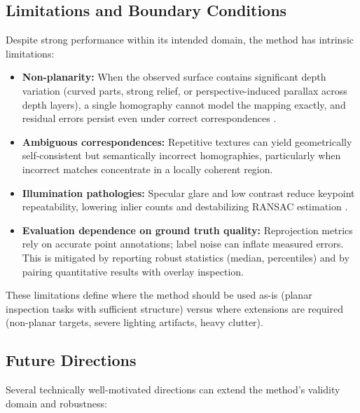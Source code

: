 \subsection{Limitations and Boundary Conditions}
Despite strong performance within its intended domain, the method has intrinsic limitations:

\begin{itemize}
  \item \textbf{Non-planarity:} When the observed surface contains significant depth variation (curved parts, strong relief, or perspective-induced parallax across depth layers), a single homography cannot model the mapping exactly, and residual errors persist even under correct correspondences \cite{HartleyZisserman2004}.
  \item \textbf{Ambiguous correspondences:} Repetitive textures can yield geometrically self-consistent but semantically incorrect homographies, particularly when incorrect matches concentrate in a locally coherent region.
  \item \textbf{Illumination pathologies:} Specular glare and low contrast reduce keypoint repeatability, lowering inlier counts and destabilizing RANSAC estimation \cite{FischlerBolles1981}.
  \item \textbf{Evaluation dependence on ground truth quality:} Reprojection metrics rely on accurate point annotations; label noise can inflate measured errors. This is mitigated by reporting robust statistics (median, percentiles) and by pairing quantitative results with overlay inspection.
\end{itemize}

These limitations define where the method should be used as-is (planar inspection tasks with sufficient structure) versus where extensions are required (non-planar targets, severe lighting artifacts, heavy clutter).

\subsection{Future Directions}
\label{subsec:future_directions}
Several technically well-motivated directions can extend the method's validity domain and robustness:

